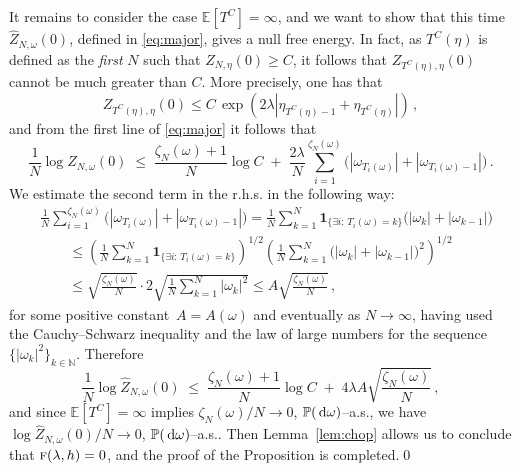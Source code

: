 \documentclass[reqno,11pt]{amsart}
\numberwithin{equation}{section}
\newcommand{\ind}{\mathbf{1}}
\newcommand{\N}{\mathbb{N}}
\newcommand{\cC}{{\ensuremath{\mathcal C}} }
\newcommand{\dd}{\,\text{\rm d}}             %
\newcommand{\bbE}{{\ensuremath{\mathbb E}} }
\newcommand{\bbP}{{\ensuremath{\mathbb P}} }
\newcommand{\go}{\omega}
\newcommand{\gl}{\lambda}
\newcommand{\tf}{\textsc{f}}
\begin{document}
It remains to consider the case $\bbE[T^C]=\infty$, and we want to show that this time $\widehat{Z}_{N,\go}(0)$, defined in \eqref{eq:major}, gives a null free energy. In fact, as $T^C(\eta)$ is defined as the \textsl{first} $N$ such that $Z_{N,\eta}(0) \ge C$, it follows that $Z_{T^C(\eta),\eta}(0)$ cannot be much greater than $C$. More precisely, one has that
\begin{equation}
Z_{T^C(\eta),\eta}(0) \le  C \,\exp(2\gl|\eta_{T^C(\eta)-1} + \eta_{T^C(\eta)}|)\,,
\end{equation}
and from the first line of \eqref{eq:major} it follows that
\begin{equation}
\frac 1N \log \widehat{Z}_{N,\go}(0) \;\le\; \frac{\zeta_N(\go)+1}{N} \log C \;+\;  \frac{2\gl}{N} \sum_{i=1}^{\zeta_N(\go)} \Big( |\go_{T_i(\go)}| + |\go_{T_i(\go)-1}| \Big)\,.
\end{equation}
We estimate the second term in the r.h.s. in the following way:
\begin{align}
    & \frac 1N \sum_{i=1}^{\zeta_N(\go)} \Big( |\go_{T_i(\go)}| + |\go_{T_i(\go)-1}| \Big) = \frac 1N \sum_{k=1}^{N} \ind_{\{\exists i:\, T_i(\go) = k\}} \Big( |\go_k| + |\go_{k-1}| \Big)\nonumber  \\
    & \qquad \le \left( \frac 1N \sum_{k=1}^{N} \ind_{\{\exists i:\, T_i(\go) = k\}} \right) ^{1/2} \left( \frac 1N \sum_{k=1}^{N} \Big( |\go_k| + |\go_{k-1}| \Big)^2 \right)^{1/2}\\
    &\qquad \le \sqrt{\frac{\zeta_N(\go)}{N}} \cdot 2 \sqrt{ \frac 1N \sum_{k=1}^{N} |\go_k|^2} \le A \sqrt{\frac{\zeta_N(\go)}{N}} \,, \nonumber
\end{align}
for some positive constant~$A=A(\go)$ and  eventually as $N \to \infty$, having used the Cauchy--Schwarz inequality and the law of large numbers for the sequence $\{|\go_k|^2\}_{k\in\N}$. Therefore
\begin{equation}
    \frac 1N \log \widehat{Z}_{N,\go}(0) \;\le\; \frac{\zeta_N(\go)+1}{N} \log C \;+\; 4\gl A \sqrt{\frac{\zeta_N(\go)}{N}}\,,
\end{equation}
and since $\bbE[T^C]=\infty$ implies $\zeta_N(\go)/N \to 0$, $\bbP(\dd\go)$--a.s., we have $\log \widehat{Z}_{N,\go}(0) /N \to 0$, $\bbP(\dd\go)$--a.s.. Then Lemma~\ref{lem:chop} allows us to conclude that $\tf (\gl,h)=0$, and the proof of the Proposition is completed.\qed


\end{document}
